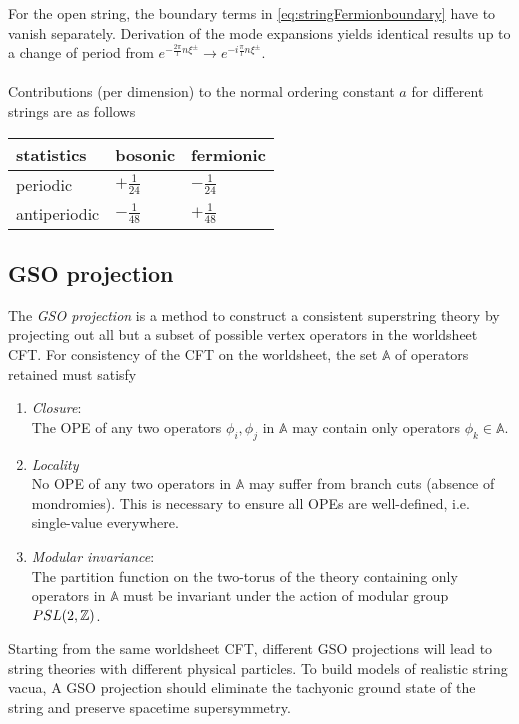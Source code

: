 For the open string, the boundary terms in \ref{eq:stringFermionboundary} have to vanish separately. Derivation of the mode expansions yields identical results up to a change of period from $e^{ - \frac{2 \pi}{l} n \xi^\pm } \rightarrow e^{-i \frac{\pi}{l} n \xi^\pm}$.
\\
\\
Contributions (per dimension) to the normal ordering constant $a$ for different strings are as follows
\bse 
\begin{tabular}{lll}
	statistics & bosonic & fermionic \\
	\toprule 
	periodic & $+ \frac{1}{24}$ & $-\frac{1}{24}$ \\
	antiperiodic & $-\frac{1}{48}$ & $+ \frac{1}{48}$ \\
	\bottomrule 
\end{tabular}
\ese 


\subsection{GSO projection} 
The \emph{GSO projection} is a method to construct a consistent superstring theory by projecting out all but a subset of possible vertex operators in the worldsheet CFT. For consistency of the CFT on the worldsheet, the set $\mathbb{A}$ of operators retained must satisfy
\begin{enumerate}
\item \emph{Closure}:\\
The OPE of any two operators $\phi_i,\phi_j$ in $\mathbb{A}$ may contain only operators $\phi_k\in \mathbb{A}$.
\item \emph{Locality} \\
No OPE of any two operators in $\mathbb{A}$ may suffer from branch cuts (absence of mondromies). This is necessary to ensure all OPEs are well-defined, i.e. single-value everywhere.
\item \emph{Modular invariance}:\\
The partition function on the two-torus of the theory containing only operators in $\mathbb{A}$ must be invariant under the action of modular group $PSL(2,\mathbb{Z})$.
\end{enumerate}
Starting from the same worldsheet CFT, different GSO projections will lead to string theories with different physical particles. To build models of realistic string vacua, A GSO projection should eliminate the tachyonic ground state of the string and preserve spacetime supersymmetry.
